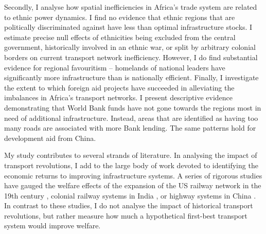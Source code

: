 \documentclass[11pt, oneside]{article}   	%
\begin{document}
Secondly, I analyse how spatial inefficiencies in Africa's trade system are related to ethnic power dynamics. I find no evidence that ethnic regions that are politically discriminated against have less than optimal infrastructure stocks. I estimate precise null effects of ethnicities being excluded from the central government, historically involved in an ethnic war, or split by arbitrary colonial borders \citep{Michalopoulos_LongRunEffectsScramble_2016} on current transport network inefficiency. However, I do find substantial evidence for regional favouritism -- homelands of national leaders have significantly more infrastructure than is nationally efficient. Finally, I investigate the extent to which foreign aid projects have succeeded in alleviating the imbalances in Africa's transport networks. I present descriptive evidence demonstrating that World Bank funds have not gone towards the regions most in need of additional infrastructure. Instead, areas that are identified as having too many roads are associated with more Bank lending. The same patterns hold for development aid from China.

My study contributes to several strands of literature. In analysing the impact of transport revolutions, I add to the large body of work devoted to identifying the economic returns to improving infrastructure systems. A series of rigorous studies have gauged the welfare effects of the expansion of the US railway network in the 19th century \citep{donaldson_railroads_2016,Swisher_ReassessingRailroadsGrowth_2017}, colonial railway systems in India \citep{Donaldson_RailroadsRajEstimating_2018,Burgess_RailroadsDemiseFamine_2012}, or highway systems in China \citep{Faber_TradeIntegrationMarket_2014,Baum-Snow_RoadsRailroadsDecentralization_2017}. In contrast to these studies, I do not analyse the impact of historical transport revolutions, but rather measure how much a hypothetical first-best transport system would improve welfare.
\end{document}
